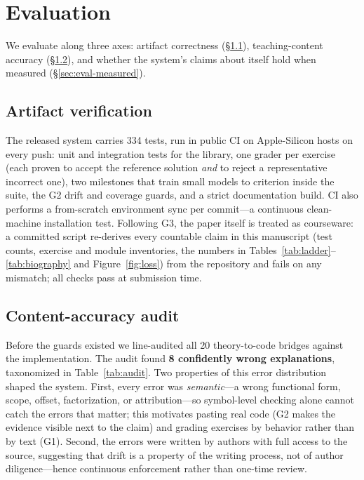 \section{Evaluation}
\label{sec:eval}

We evaluate along three axes: artifact correctness
(\S\ref{sec:eval-artifact}), teaching-content accuracy
(\S\ref{sec:eval-audit}), and whether the system's claims about itself hold
when measured (\S\ref{sec:eval-measured}).

\subsection{Artifact verification}
\label{sec:eval-artifact}

The released system carries 334 tests, run in public CI on Apple-Silicon
hosts on every push: unit and integration tests for the library, one grader
per exercise (each proven to accept the reference solution \emph{and} to
reject a representative incorrect one), two milestones that train small
models to criterion inside the suite, the G2 drift and coverage guards, and a
strict documentation build. CI also performs a from-scratch environment sync
per commit---a continuous clean-machine installation test. Following G3, the
paper itself is treated as courseware: a committed script re-derives every
countable claim in this manuscript (test counts, exercise and module
inventories, the numbers in Tables~\ref{tab:ladder}--\ref{tab:biography} and
Figure~\ref{fig:loss}) from the repository and fails on any mismatch; all
checks pass at submission time.

\subsection{Content-accuracy audit}
\label{sec:eval-audit}

Before the guards existed we line-audited all 20 theory-to-code bridges
against the implementation. The audit found \textbf{8 confidently wrong
explanations}, taxonomized in Table~\ref{tab:audit}. Two properties of this
error distribution shaped the system. First, every error was
\emph{semantic}---a wrong functional form, scope, offset, factorization, or
attribution---so symbol-level checking alone cannot catch the errors that
matter; this motivates pasting real code (G2 makes the evidence visible next
to the claim) and grading exercises by behavior rather than by text (G1).
Second, the errors were written by authors with full access to the source,
suggesting that drift is a property of the writing process, not of author
diligence---hence continuous enforcement rather than one-time review.

